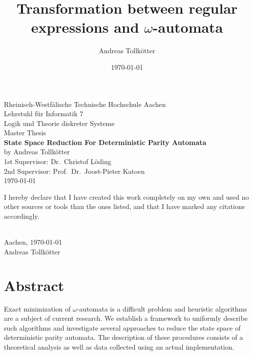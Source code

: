 \title{Transformation between regular expressions and $\omega$-automata}
\author{Andreas Tollkötter}
\date{\today}

\pagestyle{empty}
\begin{titlepage}
\begin{center}
	\vspace*{\fill}
		\LARGE Rheinisch-Westfälische Technische Hochschule Aachen \\
	\vspace*{1cm}
		\LARGE Lehrstuhl für Informatik 7 \\
		\Large Logik und Theorie diskreter Systeme \\
	\vspace*{2cm}
		\LARGE Master Thesis \\
	\vspace*{5mm}
		\huge \textbf{State Space Reduction For Deterministic Parity Automata} \\
	\vspace*{1cm}
		\Large by Andreas Tollkötter \\
	\vspace*{5mm}
		\Large 1st Supervisor: Dr.\ Christof Löding \\
		\Large 2nd Supervisor: Prof.\ Dr.\ Joost-Pieter Katoen \\
	\vspace*{2cm}
		\large \today 
	\vspace*{\fill}
\end{center}
\end{titlepage}



\par\vspace*{\fill}
\noindent
I hereby declare that I have created this work completely on
my own and used no other sources or tools than the ones
listed, and that I have marked any citations accordingly. \\
\vspace*{1cm}

\begin{flushright}
\underline{\hspace{5cm}} \\
Aachen, \today \\
Andreas Tollkötter
\end{flushright}



\chapter*{Abstract}
Exact minimization of $\omega$-automata is a difficult problem and heuristic algorithms are a subject of current research. We establish a framework to uniformly describe such algorithms and investigate several approaches to reduce the state space of deterministic parity automata. The description of these procedures consists of a theoretical analysis as well as data collected using an actual implementation.



